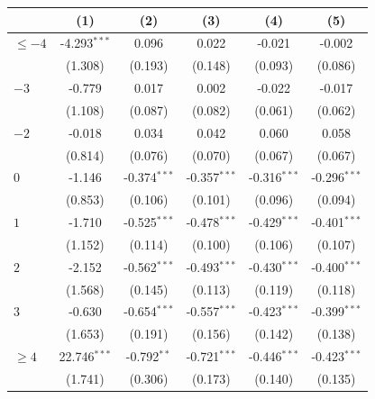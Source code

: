 
\begingroup
\centering
\begin{tabular}{lccccc}
   \toprule
                        & (1)             & (2)            & (3)            & (4)            & (5)\\  
   \midrule 
   $\leq -4$            & -4.293$^{***}$  & 0.096          & 0.022          & -0.021         & -0.002\\   
                        & (1.308)         & (0.193)        & (0.148)        & (0.093)        & (0.086)\\   
   $-3$                 & -0.779          & 0.017          & 0.002          & -0.022         & -0.017\\   
                        & (1.108)         & (0.087)        & (0.082)        & (0.061)        & (0.062)\\   
   $-2$                 & -0.018          & 0.034          & 0.042          & 0.060          & 0.058\\   
                        & (0.814)         & (0.076)        & (0.070)        & (0.067)        & (0.067)\\   
   $0$                  & -1.146          & -0.374$^{***}$ & -0.357$^{***}$ & -0.316$^{***}$ & -0.296$^{***}$\\   
                        & (0.853)         & (0.106)        & (0.101)        & (0.096)        & (0.094)\\   
   $1$                  & -1.710          & -0.525$^{***}$ & -0.478$^{***}$ & -0.429$^{***}$ & -0.401$^{***}$\\   
                        & (1.152)         & (0.114)        & (0.100)        & (0.106)        & (0.107)\\   
   $2$                  & -2.152          & -0.562$^{***}$ & -0.493$^{***}$ & -0.430$^{***}$ & -0.400$^{***}$\\   
                        & (1.568)         & (0.145)        & (0.113)        & (0.119)        & (0.118)\\   
   $3$                  & -0.630          & -0.654$^{***}$ & -0.557$^{***}$ & -0.423$^{***}$ & -0.399$^{***}$\\   
                        & (1.653)         & (0.191)        & (0.156)        & (0.142)        & (0.138)\\   
   $\geq 4$             & 22.746$^{***}$  & -0.792$^{**}$  & -0.721$^{***}$ & -0.446$^{***}$ & -0.423$^{***}$\\   
                        & (1.741)         & (0.306)        & (0.173)        & (0.140)        & (0.135)\\   

\end{tabular}
